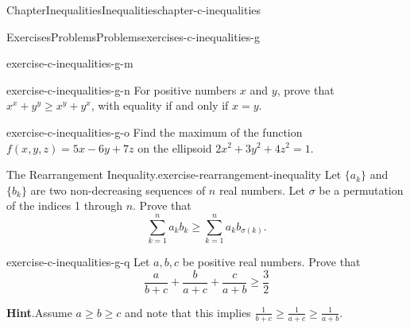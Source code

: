 \documentclass[oneside,10pt,]{book}
\newcommand{\blocktitlefont}{\relax}
\numberwithin{equation}{section}
\begin{document}
\begin{chapterptx}{Chapter}{Inequalities}{}{Inequalities}{}{}{chapter-c-inequalities}
\begin{exercises-section}{Exercises}{Problems}{}{Problems}{}{}{exercises-c-inequalities-g}
\begin{divisionexercise}{12}{}{}{exercise-c-inequalities-g-m}
\end{divisionexercise}%
\begin{divisionexercise}{13}{}{}{exercise-c-inequalities-g-n}%
For positive numbers \(x\) and \(y\), prove that \(x^x+y^y\geq x^y+ y^x\), with equality if and only if \(x=y\).%
\end{divisionexercise}%
\begin{divisionexercise}{14}{}{}{exercise-c-inequalities-g-o}%
Find the maximum of the function \(f(x,y,z)=5x -6y+7z\) on the ellipsoid \(2x^2+3y^2+4z^2=1\).%
\end{divisionexercise}%
\begin{divisionexercise}{15}{The Rearrangement Inequality.}{}{exercise-rearrangement-inequality}%
%
Let \(\{a_k\}\) and \(\{b_k\}\) are two non-decreasing sequences of \(n\) real numbers.  Let \(\sigma\) be a permutation of the indices 1 through \(n\).  Prove that%
\begin{equation*}
\sum_{k=1}^n a_k b_k \ge \sum_{k=1}^n a_k b_{\sigma(k)}.
\end{equation*}
%
\end{divisionexercise}%
\begin{divisionexercise}{16}{}{}{exercise-c-inequalities-g-q}%
Let \(a, b, c\) be positive real numbers.  Prove that%
\begin{equation*}
\frac{a}{b+c} + \frac{b}{a+c}+ \frac{c}{a+b} \ge \frac{3}{2}
\end{equation*}
%
\par\smallskip%
\noindent\textbf{\blocktitlefont Hint}.\hypertarget{hint-c-inequalities-g-q-b}{}\quad{}Assume \(a \ge b \ge c\) and note that this implies \(\frac{1}{b+c} \ge \frac{1}{a+c} \ge \frac{1}{a+b}\).%
\end{divisionexercise}%
\end{exercises-section}
\end{chapterptx}
%
%
\typeout{************************************************}
\typeout{************************************************}
%
\end{document}
